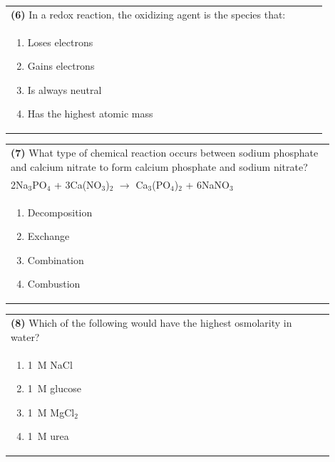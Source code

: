 \documentclass{article}
\begin{document}
\noindent\begin{tabular}{|p{0.9\linewidth}|}
\hline
\textbf{(6)} In a redox reaction, the oxidizing agent is the species that:\\[0.2cm]
\begin{minipage}[t]{0.85\linewidth}
\begin{enumerate}[label=\alph*.]
\item Loses electrons
\item Gains electrons
\item Is always neutral
\item Has the highest atomic mass
\end{enumerate}
\end{minipage}\\[0.2cm]
\hline
\end{tabular}

\noindent\begin{tabular}{|p{0.9\linewidth}|}
\hline
\textbf{(7)} What type of chemical reaction occurs between sodium phosphate and calcium nitrate to form calcium phosphate and sodium nitrate?\\[0.2cm]
2Na$_3$PO$_4$ + 3Ca(NO$_3$)$_2$ $\rightarrow$ Ca$_3$(PO$_4$)$_2$ + 6NaNO$_3$\\[0.2cm]
\begin{minipage}[t]{0.85\linewidth}
\begin{enumerate}[label=\alph*.]
\item Decomposition
\item Exchange
\item Combination
\item Combustion
\end{enumerate}
\end{minipage}\\[0.2cm]
\hline
\end{tabular}

\noindent\begin{tabular}{|p{0.9\linewidth}|}
\hline
\textbf{(8)} Which of the following would have the highest osmolarity in water?\\[0.2cm]
\begin{minipage}[t]{0.85\linewidth}
\begin{enumerate}[label=\alph*.]
\item 1~M NaCl
\item 1~M glucose
\item 1~M MgCl$_2$
\item 1~M urea
\end{enumerate}
\end{minipage}\\[0.2cm]
\hline
\end{tabular}
\newpage
\end{document}
